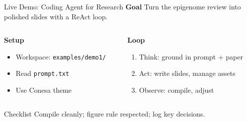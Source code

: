 \documentclass[aspectratio=169]{beamer}
\begin{document}
\begin{frame}{Live Demo: Coding Agent for Research}
  \textbf{Goal}\; Turn the epigenome review into polished slides with a ReAct loop.

  \vspace{0.4cm}
  \begin{columns}[T]
    \begin{column}{0.52\textwidth}
      \textbf{Setup}
      \begin{itemize}
        \item Workspace: \texttt{examples/demo1/}
        \item Read \texttt{prompt.txt}
        \item Use Conesa theme
      \end{itemize}
    \end{column}
    \begin{column}{0.44\textwidth}
      \textbf{Loop}
      \begin{enumerate}
        \item Think: ground in prompt + paper
        \item Act: write slides, manage assets
        \item Observe: compile, adjust
      \end{enumerate}
    \end{column}
  \end{columns}

  \begin{alertblock}{Checklist}
    Compile cleanly; figure rule respected; log key decisions.
  \end{alertblock}
\end{frame}
\end{document}
